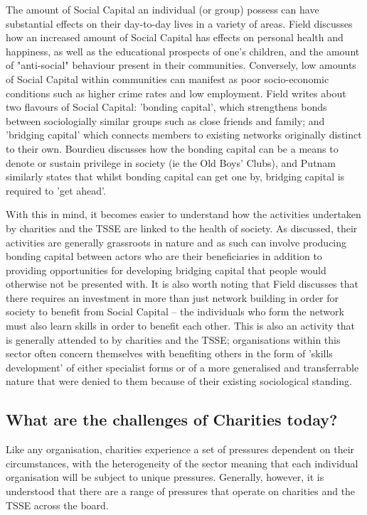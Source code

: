 The amount of Social Capital an individual (or group) possess can have substantial effects on their day-to-day lives in a variety of areas. Field discusses how an increased amount of Social Capital has effects on personal health and happiness, as well as the educational prospects of one's children, and the amount of "anti-social" behaviour present in their communities. Conversely, low amounts of Social Capital within communities can manifest as poor socio-economic conditions such as higher crime rates and low employment. Field writes about two flavours of Social Capital: 'bonding capital', which strengthens bonds between sociologially similar groups such as close friends and family; and 'bridging capital' which connects members to existing networks originally distinct to their own. Bourdieu discusses how the bonding capital can be a means to denote or sustain privilege in society (ie the Old Boys' Clubs), and Putnam similarly states that whilst bonding capital can get one by, bridging capital is required to 'get ahead'.

With this in mind, it becomes easier to understand how the activities undertaken by charities and the TSSE are linked to the health of society. As discussed, their activities are generally grassroots in nature and as such can involve producing bonding capital between actors who are their beneficiaries in addition to providing opportunities for developing bridging capital that people would otherwise not be presented with. It is also worth noting that Field discusses that there requires an investment in more than just network building in order for society to benefit from Social Capital -- the individuals who form the network must also learn skills in order to benefit each other. This is also an activity that is generally attended to by charities and the TSSE; organisations within this sector often concern themselves with benefiting others in the form of 'skills development' of either specialist forms or of a more generalised and transferrable nature that were denied to them because of their existing sociological standing.

\subsection{What are the challenges of Charities today?}
Like any organisation, charities experience a set of pressures dependent on their circumstances, with the heterogeneity of the sector meaning that each individual organisation will be subject to unique pressures. Generally, however, it is understood that there are a range of pressures that operate on charities and the TSSE across the board.

